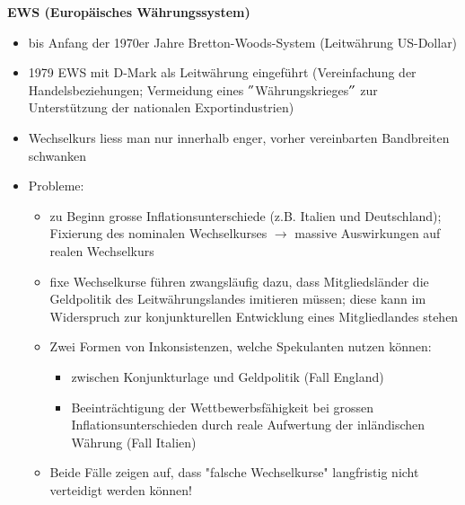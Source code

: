 \textbf{EWS (Europäisches Währungssystem)}\\
\begin{itemize}
	\item bis Anfang der 1970er Jahre Bretton-Woods-System (Leitwährung US-Dollar)
	\item 1979 EWS mit D-Mark als Leitwährung eingeführt (Vereinfachung der Handelsbeziehungen; Vermeidung eines $"$Währungskrieges$"$ zur Unterstützung der nationalen Exportindustrien)
	\item Wechselkurs liess man nur innerhalb enger, vorher vereinbarten Bandbreiten schwanken
	\item Probleme: 
	\begin{itemize}
		\item zu Beginn grosse Inflationsunterschiede (z.B. Italien und Deutschland); Fixierung des nominalen Wechselkurses $\rightarrow$ massive Auswirkungen auf realen Wechselkurs
		\item fixe Wechselkurse führen zwangsläufig dazu, dass Mitgliedsländer die Geldpolitik des Leitwährungslandes imitieren müssen; diese kann im Widerspruch zur konjunkturellen Entwicklung eines Mitgliedlandes stehen
		\item Zwei Formen von Inkonsistenzen, welche Spekulanten nutzen können:
		\begin{itemize}
			\item zwischen Konjunkturlage und Geldpolitik (Fall England)
			\item Beeinträchtigung der Wettbewerbsfähigkeit bei grossen Inflationsunterschieden durch reale Aufwertung der inländischen Währung (Fall Italien)
		\end{itemize}
		\item Beide Fälle zeigen auf, dass "falsche Wechselkurse" langfristig nicht verteidigt werden können!
	\end{itemize}
\end{itemize}
